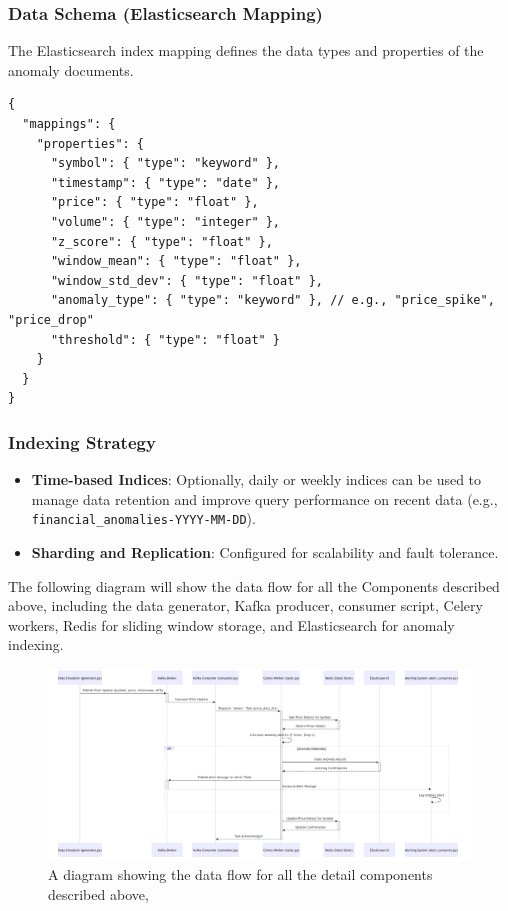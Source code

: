 \subsubsection{Data Schema (Elasticsearch Mapping)}

The Elasticsearch index mapping defines the data types and properties of the anomaly documents.
\begin{verbatim}
{
  "mappings": {
    "properties": {
      "symbol": { "type": "keyword" },
      "timestamp": { "type": "date" },
      "price": { "type": "float" },
      "volume": { "type": "integer" },
      "z_score": { "type": "float" },
      "window_mean": { "type": "float" },
      "window_std_dev": { "type": "float" },
      "anomaly_type": { "type": "keyword" }, // e.g., "price_spike", "price_drop"
      "threshold": { "type": "float" }
    }
  }
}
\end{verbatim}

\subsubsection{Indexing Strategy}
\begin{itemize}
    \item \textbf{Time-based Indices}: Optionally, daily or weekly indices can be used to manage data retention and improve query performance on recent data (e.g., \texttt{financial\_anomalies-YYYY-MM-DD}).
    \item \textbf{Sharding and Replication}: Configured for scalability and fault tolerance.
\end{itemize}


The following diagram will show the data flow for all the Components described above, including the data generator, Kafka producer, consumer script, Celery workers, Redis for sliding window storage, and Elasticsearch for anomaly indexing.


\begin{figure}
\centering


\includegraphics[width=\textwidth]{figures/backend-1.png}

\caption{A diagram showing the data flow for all the detail components described above,}

\label{fig:Expdiagram1}
\end{figure}

